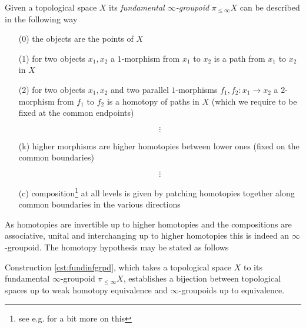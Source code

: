 \begin{cst}
\label{cst:fundinfgrpd}
Given a topological space $X$ its \textit{fundamental $\infty$-groupoid} $\pi_{\leq\infty}X$ can be described in the following way
\begin{enumerate}
\item[(0)]
the objects are the points of $X$

\item[(1)]
for two objects $x_{1},x_{2}$ a $1$-morphism from $x_{1}$ to $x_{2}$ is a path from $x_{1}$ to $x_{2}$ in $X$

\item[(2)]
for two objects $x_{1},x_{2}$ and two parallel $1$-morphisms $f_{1},f_{2} \colon x_{1} \to x_{2}$ a $2$-morphism from $f_{1}$ to $f_{2}$ is a homotopy of paths in $X$ (which we require to be fixed at the common endpoints)

\item[]
\begin{equation*}
\vdots
\end{equation*}
\item[]

\item[(k)]
higher morphisms are higher homotopies between lower ones (fixed on the common boundaries)

\item[]
\begin{equation*}
\vdots
\end{equation*}
\item[]

\item[(c)]
composition\footnote{see e.g. \cite{00000001} for a bit more on this} at all levels is given by patching homotopies together along common boundaries in the various directions
\end{enumerate}
\end{cst}
As homotopies are invertible up to higher homotopies and the compositions are associative, unital and interchanging up to higher homotopies this is indeed an $\infty$-groupoid. The homotopy hypothesis may be stated as follows
\\
\begin{prp}
\label{prp:homhyp}
Construction \ref{cst:fundinfgrpd}, which takes a topological space $X$ to its fundamental $\infty$-groupoid $\pi_{\leq\infty}X$, establishes a bijection between topological spaces up to weak homotopy equivalence and $\infty$-groupoids up to equivalence.
\end{prp}
